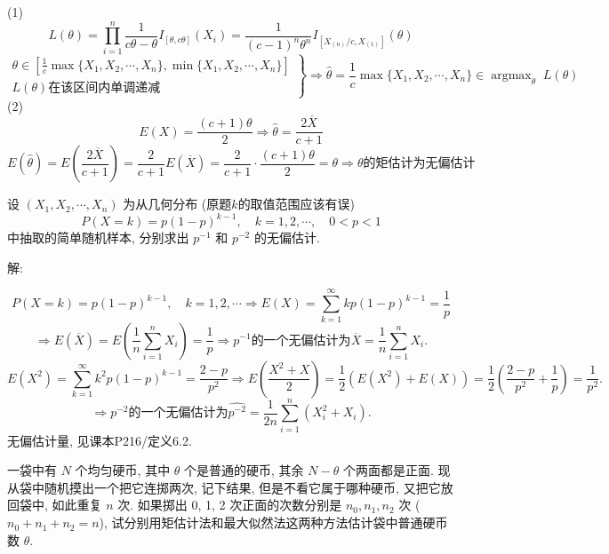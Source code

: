 \documentclass[standard]{ExBook}
\renewenvironment{shaded}{%
  \def\FrameCommand{\fboxsep=\FrameSep \colorbox{shadecolor}}%
  \MakeFramed{\advance\hsize-\width \FrameRestore}%
}{%
  \endMakeFramed
}
\begin{document}
\begin{qitems}
(1)
$$
L(\theta) =
\prod_{i=1}^n \frac{1}{c\theta - \theta} I_{[\theta, c\theta]}(X_i)
= \frac{1}{(c-1)^n \theta^n} I_{[X_{(n)}/c, X_{(1)}]}(\theta)
$$
$$
\left.
\begin{array}{r}
\theta \in \left[\frac{1}{c} \max\{X_1, X_2, \cdots, X_n\}, \min\{X_1, X_2, \cdots, X_n\}\right]\\
L(\theta) \text{在该区间内单调递减}
\end{array}
\right\}
\Longrightarrow
\hat{\theta}
= \frac{1}{c} \max\{X_1, X_2, \cdots, X_n\}
\in
\mathop{\mathrm{argmax}}_{\theta}\;L(\theta)
$$
(2)
$$
E(X)
= \frac{(c+1)\theta}{2}
\Longrightarrow
\hat{\theta} = \frac{2\overline{X}}{c+1}
$$
$$
E(\hat{\theta}) = E\left(\frac{2\overline{X}}{c+1}\right)
= \frac{2}{c+1} E(\overline{X})
= \frac{2}{c+1} \cdot \frac{(c+1)\theta}{2}
= \theta
\Longrightarrow
\theta \text{的矩估计为无偏估计}
$$

\vspace{2.5cm-5em}

    \begin{bbox}
    \begin{shaded}
        \qitem
设 \((X_1, X_2, \cdots, X_n)\) 为从几何分布 (原题$k$的取值范围应该有误) 
\[P(X = k) = p(1 - p)^{k-1}, \quad k = 1, 2, \cdots, \quad 0 < p < 1\]
中抽取的简单随机样本, 分别求出 \( p^{-1} \) 和 \( p^{-2} \) 的无偏估计.
    \end{shaded}
    \end{bbox}

\vspace{\dimexpr2.5cm-5em\relax}

解: 

$$
P(X=k)=p(1-p)^{k-1},\quad k=1,2,\cdots
\Longrightarrow
E(X)
=\sum_{k=1}^{\infty}k p(1-p)^{k-1}
=\frac{1}{p}
$$
$$
\Longrightarrow
E(\overline{X})
=E\left(\frac{1}{n}\sum_{i=1}^{n}X_i\right)
=\frac{1}{p}
\Longrightarrow
p^{-1}\text{的一个无偏估计为}
\overline{X}
=\frac{1}{n}\sum_{i=1}^{n}X_i.
$$
$$
E(X^2)
=\sum_{k=1}^{\infty}k^2 p(1-p)^{k-1}
=\frac{2-p}{p^2}
\Longrightarrow
E\left(\frac{X^2+X}{2}\right)
=\frac{1}{2}\left(E(X^2)+E(X)\right)
=\frac{1}{2}\left(\frac{2-p}{p^2}+\frac{1}{p}\right)
=\frac{1}{p^2}.
$$
$$
\Longrightarrow
p^{-2}\text{的一个无偏估计为}
\widehat{p^{-2}}
=\frac{1}{2n}\sum_{i=1}^{n}(X_i^2+X_i).
$$
\textcolor{themeColor}{\selectfont {} 无偏估计量, 见课本P216/定义6.2.}

\vspace{2.5cm-5em}

    \begin{bbox}
    \begin{shaded}
        \qitem
一袋中有 \( N \) 个均匀硬币, 其中 \( \theta \) 个是普通的硬币, 其余 \( N - \theta \) 个两面都是正面. 现从袋中随机摸出一个把它连掷两次, 记下结果, 但是不看它属于哪种硬币, 又把它放回袋中, 如此重复 \( n \) 次. 如果掷出 0, 1, 2 次正面的次数分别是 \( n_0, n_1, n_2 \) 次 (\( n_0 + n_1 + n_2 = n \)), 试分别用矩估计法和最大似然法这两种方法估计袋中普通硬币数 \( \theta \).
    \end{shaded}
    \end{bbox}


\end{qitems}
\end{document}
